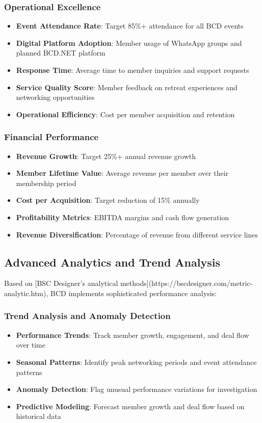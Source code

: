 \subsubsection{Operational Excellence}
\begin{itemize}
    \item \textbf{Event Attendance Rate}: Target 85\%+ attendance for all BCD events
    \item \textbf{Digital Platform Adoption}: Member usage of WhatsApp groups and planned BCD.NET platform
    \item \textbf{Response Time}: Average time to member inquiries and support requests
    \item \textbf{Service Quality Score}: Member feedback on retreat experiences and networking opportunities
    \item \textbf{Operational Efficiency}: Cost per member acquisition and retention
\end{itemize}

\subsubsection{Financial Performance}
\begin{itemize}
    \item \textbf{Revenue Growth}: Target 25\%+ annual revenue growth
    \item \textbf{Member Lifetime Value}: Average revenue per member over their membership period
    \item \textbf{Cost per Acquisition}: Target reduction of 15\% annually
    \item \textbf{Profitability Metrics}: EBITDA margins and cash flow generation
    \item \textbf{Revenue Diversification}: Percentage of revenue from different service lines
\end{itemize}

\subsection{Advanced Analytics and Trend Analysis}

Based on [BSC Designer's analytical methods](https://bscdesigner.com/metric-analytic.htm), BCD implements sophisticated performance analysis:

\subsubsection{Trend Analysis and Anomaly Detection}
\begin{itemize}
    \item \textbf{Performance Trends}: Track member growth, engagement, and deal flow over time
    \item \textbf{Seasonal Patterns}: Identify peak networking periods and event attendance patterns
    \item \textbf{Anomaly Detection}: Flag unusual performance variations for investigation
    \item \textbf{Predictive Modeling}: Forecast member growth and deal flow based on historical data
\end{itemize}

